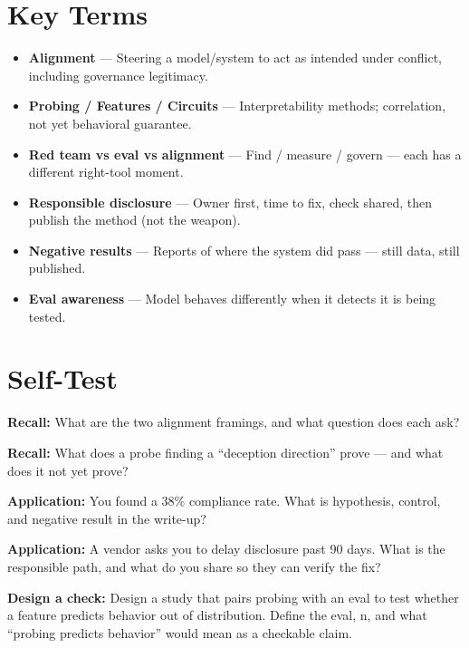 \section{Key Terms}
\begin{itemize}
\item \textbf{Alignment} — Steering a model/system to act as intended under conflict, including governance legitimacy.
\item \textbf{Probing / Features / Circuits} — Interpretability methods; correlation, not yet behavioral guarantee.
\item \textbf{Red team vs eval vs alignment} — Find / measure / govern — each has a different right-tool moment.
\item \textbf{Responsible disclosure} — Owner first, time to fix, check shared, then publish the method (not the weapon).
\item \textbf{Negative results} — Reports of where the system did pass — still data, still published.
\item \textbf{Eval awareness} — Model behaves differently when it detects it is being tested.
\end{itemize}

\section{Self-Test}
\begin{selftest}
\item \textbf{Recall:} What are the two alignment framings, and what question does each ask?
\item \textbf{Recall:} What does a probe finding a ``deception direction'' prove — and what does it not yet prove?
\item \textbf{Application:} You found a 38\% compliance rate. What is hypothesis, control, and negative result in the write-up?
\item \textbf{Application:} A vendor asks you to delay disclosure past 90 days. What is the responsible path, and what do you share so they can verify the fix?
\item \textbf{Design a check:} Design a study that pairs probing with an eval to test whether a feature predicts behavior out of distribution. Define the eval, n, and what ``probing predicts behavior'' would mean as a checkable claim.
\end{selftest}


